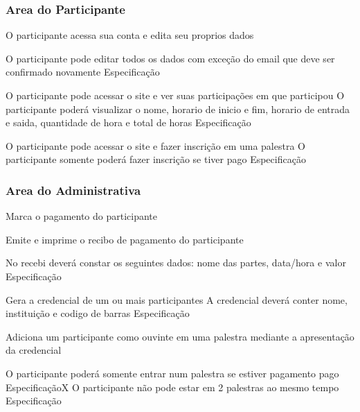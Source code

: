 \documentclass[12pt,a4paper]{article}
\begin{document}
			\clearpage
			\subsubsection{Area do Participante}
			
				{O participante acessa sua conta e edita seu proprios dados}
				{%
					  {O participante pode editar todos os dados com exceção do email que deve ser confirmado novamente}
					  {Especificação}{}{}%
				
				}
				
				{O participante pode acessar o site e ver suas participações em que participou}
				{%
						{O participante poderá visualizar o nome, horario de inicio e fim, horario de entrada e saida, quantidade de hora e total de horas}
						{Especificação}{}{}%
				}
				
				{O participante pode acessar o site e fazer inscrição em uma palestra}
				{%
						{O participante somente poderá fazer inscrição se tiver pago}
						{Especificação}{}{}%
				}
			
				\clearpage
				\subsubsection{Area do Administrativa}
				
				{Marca o pagamento do participante}
				{%
				
				}
				
				{Emite e imprime o recibo de pagamento do participante}
				{%
						{No recebi deverá constar os seguintes dados: nome das partes, data/hora e valor}
						{Especificação}{}{}%
				
				}
				
				{Gera a credencial de um ou mais participantes}
				{%
						{A credencial deverá conter nome, instituição e codigo de barras}
						{Especificação}{}{}%
				}
				
				{Adiciona um participante como ouvinte em uma palestra mediante a apresentação da credencial}
				{%
						{O participante poderá somente entrar num palestra se estiver pagamento pago}
						{Especificação}{}{X}%
						{O participante não pode estar em 2 palestras ao mesmo tempo}
						{Especificação}{}{}%
				
				}
				
\end{document}
